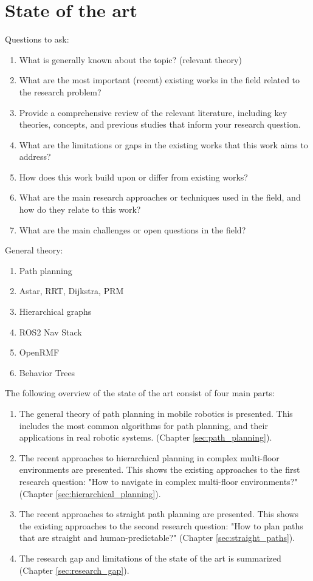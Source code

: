 \chapter{State of the art}
\label{sec:state_of_the_art}
Questions to ask:
\begin{enumerate}
    \item What is generally known about the topic? (relevant theory)
    \item What are the most important (recent) existing works in the field related to the research problem? 
    \item Provide a comprehensive review of the relevant literature, including key theories, concepts, and previous studies that inform your research question.
    \item What are the limitations or gaps in the existing works that this work aims to address? 
    \item How does this work build upon or differ from existing works? 
    \item What are the main research approaches or techniques used in the field, and how do they relate to this work? 
    \item What are the main challenges or open questions in the field? 
\end{enumerate}

General theory:
\begin{enumerate}
    \item Path planning
    \item Astar, RRT, Dijkstra, PRM
    \item Hierarchical graphs
    \item ROS2 Nav Stack
    \item OpenRMF
    \item Behavior Trees
\end{enumerate}

The following overview of the state of the art consist of four main parts:
\begin{enumerate}
    \item The general theory of path planning in mobile robotics is presented. This includes the most common algorithms for path planning, and their applications in real robotic systems. (Chapter \ref{sec:path_planning}).
    \item The recent approaches to hierarchical planning in complex multi-floor environments are presented. This shows the existing approaches to the first research question: "How to navigate in complex multi-floor environments?" (Chapter \ref{sec:hierarchical_planning}).
    \item The recent approaches to straight path planning are presented. This shows the existing approaches to the second research question: "How to plan paths that are straight and human-predictable?" (Chapter \ref{sec:straight_paths}).
    \item The research gap and limitations of the state of the art is summarized (Chapter \ref{sec:research_gap}).
\end{enumerate}

